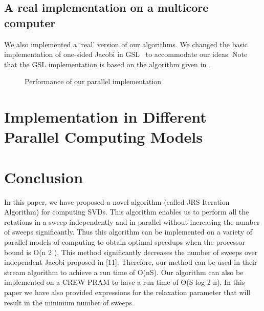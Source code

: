 \documentclass[10pt, conference, compsocconf]{IEEEtran}
\begin{document}
\subsection{A real implementation on a multicore computer}

We also implemented a `real' version of our algorithms. We changed the basic implementation of one-sided Jacobi in GSL~\cite{galassi1996gnu} to accommodate our ideas. Note that the GSL implementation is based on the algorithm given in~\cite{nash1975one}.



\begin{figure}[!htb]
\centering
{} \hfill
{}
\caption{Performance of our parallel implementation}
\end{figure}

\section{Implementation in Different Parallel Computing Models}
\label{sec:other}


\section{Conclusion}
\label{sec:conclude}

In this paper, we have proposed a novel algorithm (called
JRS Iteration Algorithm) for computing SVDs. This algorithm
enables us to perform all the rotations in a sweep independently
and in parallel without increasing the number of sweeps
significantly. Thus this algorithm can be implemented on a
variety of parallel models of computing to obtain optimal
speedups when the processor bound is O(n 2 ). This method
significantly decreases the number of sweeps over independent
Jacobi proposed in [11]. Therefore, our method can be used
in their stream algorithm to achieve a run time of O(nS). Our
algorithm can also be implemented on a CREW PRAM to have
a run time of O(S log 2 n). In this paper we have also provided
expressions for the relaxation parameter that will result in the
minimum number of sweeps.
\end{document}
